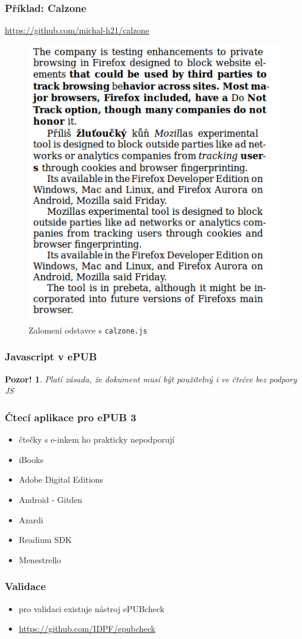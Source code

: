 \documentclass[czech]{beamer}
\newtheorem{pozor}{Pozor!}
\begin{document}
\begin{frame}
        \frametitle{Příklad: Calzone }
\url{https://github.com/michal-h21/calzone}
\begin{figure}
  \includegraphics[width=.6\textwidth]{examples/with-calzone.png}
  \caption{Zalomení odstavce s \texttt{calzone.js}}
  \end{figure}
\end{frame}
\begin{frame}
  \frametitle{Javascript v ePUB}
\begin{pozor}
        Platí zásada, že dokument musí být použitelný i ve čtečce bez podpory JS
      \end{pozor}
\end{frame}
\begin{frame}
  \frametitle{Čtecí aplikace pro ePUB 3}
  \begin{itemize}
  \item čtečky s e-inkem ho prakticky nepodporují
  \item iBooks
  \item Adobe Digital Editions
  \item Android - Gitden
  \item Azardi
  \item Readium SDK
  \item Menestrello
\end{itemize}
\end{frame}
\begin{frame}
  \frametitle{Validace}
  \begin{itemize}
    \item pro validaci existuje nástroj ePUBcheck
    \item \url{https://github.com/IDPF/epubcheck}
  \end{itemize}
\end{frame}
\end{document}
